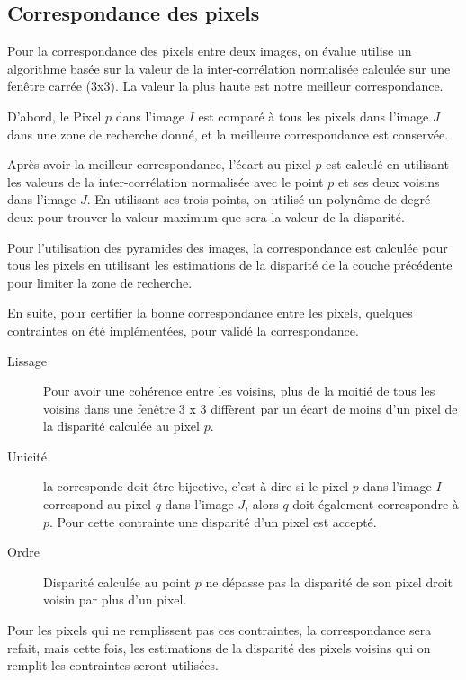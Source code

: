 \documentclass[a4paper,12pt]{article}
\begin{document}
\newpage
\subsection{Correspondance des pixels}

Pour la correspondance des pixels entre deux images, on évalue utilise
un algorithme basée sur la valeur de la inter-corrélation normalisée
calculée sur une fenêtre carrée (3x3). La valeur la plus haute est
notre meilleur correspondance. 

D'abord, le Pixel $p$ dans l'image $I$ est comparé à tous les pixels
dans l'image $J$ dans une zone de recherche donné, et la meilleure
correspondance est conservée.  

Après avoir la meilleur correspondance, l'écart au pixel $p$ est
calculé en utilisant les valeurs de la inter-corrélation normalisée
avec le point $p$ et ses deux voisins dans l'image $J$. En utilisant
ses trois points, on utilisé un polynôme de degré deux pour trouver la
valeur maximum que sera la valeur de la disparité. 

Pour l'utilisation des pyramides des images, la correspondance est
calculée pour tous les pixels en utilisant les estimations de la
disparité de la couche précédente pour limiter la zone de recherche.  

En suite, pour certifier la bonne correspondance entre les pixels,
quelques contraintes on été implémentées, pour validé la
correspondance.
\begin{description}

\item[Lissage] Pour avoir une cohérence entre les voisins, plus de la
  moitié de tous les voisins dans une fenêtre 3 x 3 diffèrent par un
  écart de moins d'un pixel de la disparité calculée au pixel $p$.  

\item[Unicité] la corresponde doit être bijective, c'est-à-dire si le
  pixel $p$ dans l'image $I$ correspond au pixel $q$ dans l'image $J$,
  alors $q$ doit également correspondre à $p$. Pour cette contrainte
  une disparité d'un pixel est accepté.
\item[Ordre] Disparité calculée au point $p$ ne dépasse pas la
  disparité de son pixel droit voisin par plus d'un pixel.
\end{description}

Pour les pixels qui ne remplissent pas ces contraintes, la
correspondance sera refait, mais cette fois, les estimations de la
disparité des pixels voisins qui on remplit les contraintes seront
utilisées. 
\end{document}
